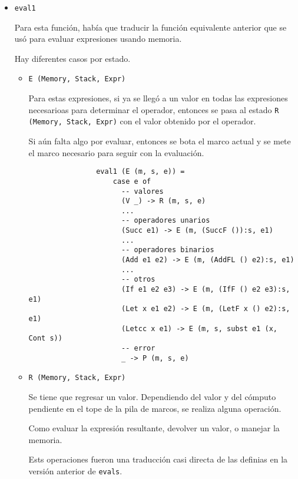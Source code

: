 \documentclass{article}
\newcommand{\tx}[1]{\texttt{#1}}
\begin{document}
    \begin{itemize}
        \item \tx{eval1}

        Para esta función, había que traducir la función equivalente anterior 
        que se usó para evaluar expresiones usando memoria.

        Hay diferentes casos por estado.

        \begin{itemize}
            \item \tx{E (Memory, Stack, Expr)}

            Para estas expresiones, si ya se llegó a un valor en todas las 
            expresiones necesarioas para determinar el operador, entonces se 
            pasa al estado \tx{R (Memory, Stack, Expr)} con el valor obtenido 
            por el operador.

            Si aún falta algo por evaluar, entonces se bota el marco actual y se
            mete el marco necesario para seguir con la evaluación.

            \begin{verbatim}
                eval1 (E (m, s, e)) = 
                    case e of
                      -- valores
                      (V _) -> R (m, s, e)
                      ...
                      -- operadores unarios
                      (Succ e1) -> E (m, (SuccF ()):s, e1)
                      ...
                      -- operadores binarios
                      (Add e1 e2) -> E (m, (AddFL () e2):s, e1)
                      ...
                      -- otros
                      (If e1 e2 e3) -> E (m, (IfF () e2 e3):s, e1)
                      (Let x e1 e2) -> E (m, (LetF x () e2):s, e1)
                      (Letcc x e1) -> E (m, s, subst e1 (x, Cont s))
                      -- error
                      _ -> P (m, s, e)
            \end{verbatim}

            \item \tx{R (Memory, Stack, Expr)}

            Se tiene que regresar un valor. Dependiendo del valor y del cómputo
            pendiente en el tope de la pila de marcos, se realiza alguna
            operación.

            Como evaluar la expresión resultante, devolver un valor, o manejar 
            la memoria.

            Ests operaciones fueron una traducción casi directa de las definias 
            en la versión anterior de \tx{evals}.


\end{itemize}
\end{itemize}
\end{document}

